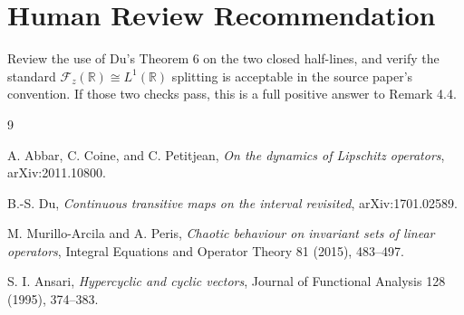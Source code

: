 \documentclass[11pt]{article}
\newcommand{\F}{\mathcal F}
\newcommand{\R}{\mathbb R}
\newcommand{\1}{\mathbf 1}
\begin{document}
\section*{Human Review Recommendation}

Review the use of Du's Theorem 6 on the two closed half-lines, and verify the
standard \(\F_z(\R)\cong L^1(\R)\) splitting is acceptable in the source
paper's convention.  If those two checks pass, this is a full positive answer
to Remark 4.4.

\begin{thebibliography}{9}

A. Abbar, C. Coine, and C. Petitjean,
\emph{On the dynamics of Lipschitz operators},
arXiv:2011.10800.

B.-S. Du,
\emph{Continuous transitive maps on the interval revisited},
arXiv:1701.02589.

M. Murillo-Arcila and A. Peris,
\emph{Chaotic behaviour on invariant sets of linear operators},
Integral Equations and Operator Theory 81 (2015), 483--497.

S. I. Ansari,
\emph{Hypercyclic and cyclic vectors},
Journal of Functional Analysis 128 (1995), 374--383.

\end{thebibliography}
\end{document}
